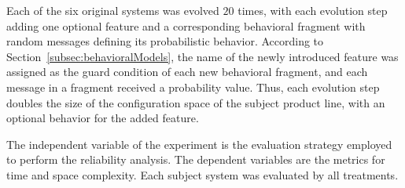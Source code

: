 \begin{table}[ht]
\vspace{12pt}
\centering
\caption{Initial version of product lines used for empirical evaluation.}
\label{table:splsEvaluated}
\end{table}

Each of the six original systems was evolved $20$ times, with each evolution
step adding one optional feature and a corresponding behavioral fragment with
random messages defining its probabilistic behavior.  According to
Section~\ref{subsec:behavioralModels}, the name of the newly introduced feature
was assigned as the guard condition of each new behavioral fragment, and each
message in a fragment received a probability value.  Thus, each evolution step
doubles the size of the configuration space of the subject product line, with an
optional behavior for the added feature.

The independent variable of the experiment is the evaluation strategy employed
to perform the reliability analysis. The dependent variables are the metrics for
time and space complexity. Each subject system was evaluated by all treatments.

